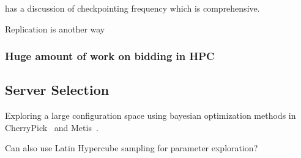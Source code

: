 \cite{dongarra_fault_nodate} has a discussion of checkpointing frequency which is comprehensive.

Replication is another way~\cite{walters_replication-based_2009}


\subsubsection{Huge amount of work on bidding in HPC}

\cite{wolski_probabilistic_2017}

\cite{guo_bidding_2015}


\subsection{Server Selection}
Exploring a large configuration space using bayesian optimization methods in CherryPick~\cite{cherrypick} and Metis~\cite{Metis-atc18}.

Can also use Latin Hypercube sampling for parameter exploration?



